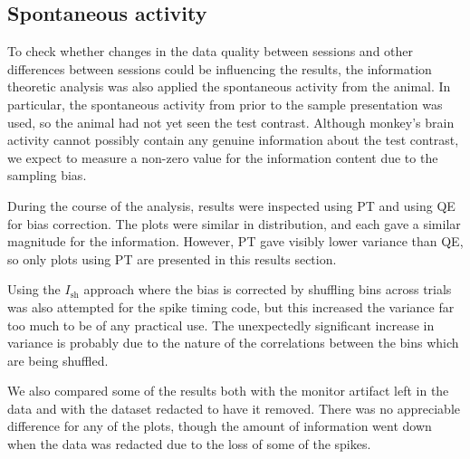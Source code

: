 \subsection{Spontaneous activity}

To check whether changes in the data quality between sessions and other differences between sessions could be influencing the results, the information theoretic analysis was also applied the spontaneous activity from the animal.
In particular, the spontaneous activity from prior to the sample presentation was used, so the animal had not yet seen the test contrast.
Although monkey's brain activity cannot possibly contain any genuine information about the test contrast, we expect to measure a non-zero value for the information content due to the sampling bias.

During the course of the analysis, results were inspected using \ac{PT} and using \ac{QE} for bias correction.
The plots were similar in distribution, and each gave a similar magnitude for the information.
However, \ac{PT} gave visibly lower variance than \ac{QE}, so only plots using \ac{PT} are presented in this results section.

Using the $I_{\text{sh}}$ approach where the bias is corrected by shuffling bins across trials \citep{Montemurro2007} was also attempted for the spike timing code, but this increased the variance far too much to be of any practical use.
The unexpectedly significant increase in variance is probably due to the nature of the correlations between the bins which are being shuffled.

We also compared some of the results both with the monitor artifact left in the data and with the dataset redacted to have it removed.
There was no appreciable difference for any of the plots, though the amount of information went down when the data was redacted due to the loss of some of the spikes.

